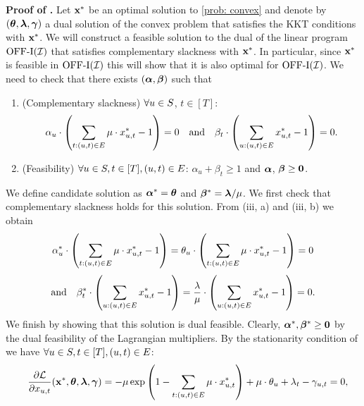 {\noindent \textbf{Proof of .}
Let $\mathbf{x}^*$ be an optimal solution to \ref{prob: convex} and denote by $(\bm{\theta}, \bm{\lambda}, \bm{\gamma})$ a dual solution of the convex problem  that satisfies the KKT conditions with $\mathbf{x}^*$. We will construct a feasible solution to the dual of the linear program $\mathrm{\mathrm{OFF}}\textrm{-}\mathrm{I}(\mathcal I)$ that satisfies complementary slackness with $\mathbf{x}^*$. In particular, since $\mathbf{x}^*$ is feasible in $\mathrm{\mathrm{OFF}}\textrm{-}\mathrm{I}(\mathcal I)$ this will show that it is also optimal for $\mathrm{\mathrm{OFF}}\textrm{-}\mathrm{I}(\mathcal I)$. We need to check that there exists $(\bm{\alpha}, \bm{\beta})$ such that
    \begin{enumerate}
            \item (Complementary slackness) $\forall u \in S$, $t \in [T]$: \begin{equation*}
                \alpha_u \cdot \left( \sum_{t:(u,t) \in E} \mu\cdot x^*_{u,t} - 1\right) = 0 \quad \text{and} \quad \beta_t \cdot \left( \sum_{u: (u,t) \in E} x^*_{u,t} - 1 \right) = 0.
            \end{equation*}
            \item (Feasibility) $\forall u \in S, t \in [T], (u,t) \in E$: $\alpha_u + \beta_t \geq 1$ and $\bm{\alpha}$, $\bm{\beta} \geq \mathbf{0}$. 
    \end{enumerate}
    We define candidate solution as $\bm{\alpha}^* = \bm{\theta}$ and $\bm{\beta}^* = \bm{\lambda}/\mu$. We first check that complementary slackness holds for this solution. From  (iii, a) and (iii, b) we obtain 
    \begin{equation*}
                \alpha_u^* \cdot \left( \sum_{t:(u,t) \in E} \mu\cdot x^*_{u,t} - 1\right) = \theta_u \cdot \left( \sum_{t:(u,t) \in E} \mu\cdot x^*_{u,t} - 1\right) = 0
            \end{equation*}
     \begin{equation*}\text{and}\quad
        \beta_t^* \cdot \left( \sum_{u: (u,t) \in E} x^*_{u,t} - 1 \right) = \frac{\lambda}{\mu} \cdot \left( \sum_{u: (u,t) \in E} x^*_{u,t} - 1 \right) = 0.
    \end{equation*}
    We finish by showing that this solution is dual feasible. Clearly, $\bm{\alpha}^*, \bm{\beta}^* \geq \mathbf{0}$ by the dual feasibility of the Lagrangian multipliers.
    By the stationarity condition of  we have $\forall u \in S, t \in [T], (u,t) \in E$:
    \begin{align}
         \quad \frac{\partial \mathcal L}{\partial x_{u,t}}(\xbf^*, \thetabf, \lambdabf, \gammabf) &= - \prob \exp\left( 1- \sum_{t: (u, t) \in E} \prob \cdot x^*_{u, t} \right) + \prob \cdot \theta_u + \lambda_t - \gamma_{u,t} = 0, \notag\\

\end{align}}
